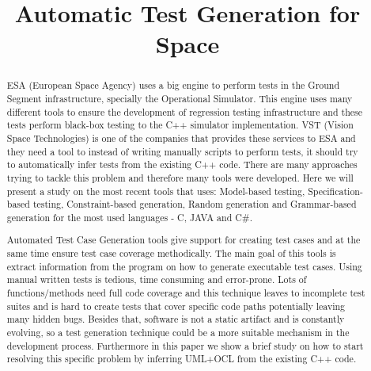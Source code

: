 \documentclass[10pt, conference, compsocconf]{IEEEtran}
\begin{document}
\title{Automatic Test Generation for Space}

\author{
\and
{}
\and
{}
}

\maketitle

\begin{abstract}
ESA (European Space Agency) uses a big engine to perform tests in the
Ground Segment infrastructure, specially the Operational Simulator.
This engine uses many different tools to ensure the development of
regression testing infrastructure and these tests perform black-box
testing to the C++ simulator implementation.
VST (Vision Space Technologies) is one of the companies that provides
these services to ESA and they need a tool to instead of writing
manually scripts to perform tests, it should try to automatically
infer tests from the existing C++ code.
There are many approaches trying to tackle this problem and therefore
many tools were developed. Here we will present a study on the most
recent tools that uses: Model-based testing, Specification-based
testing, Constraint-based generation, Random generation and
Grammar-based generation for the most used languages - C, JAVA and C\#.

Automated Test Case Generation tools give support for creating test
cases and at the same time ensure test case coverage methodically. The
main goal of this tools is extract information from the program on how
to generate executable test cases.
Using manual written tests is tedious, time consuming and error-prone.
Lots of functions/methods need full code coverage and this technique
leaves to incomplete test suites and is hard to create tests that
cover specific code paths potentially leaving many hidden bugs.
Besides that, software is not a static artifact and is constantly
evolving, so a test generation technique could be a more suitable
mechanism in the development process.
Furthermore in this paper we show a brief study on how to start resolving this specific problem by inferring UML+OCL from the existing C++ code.
\end{abstract}
\end{document}
